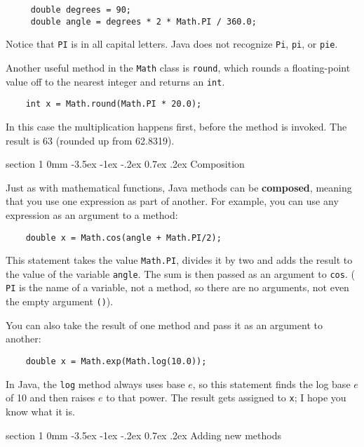 \documentclass{book}
\makeatletter
\renewcommand{\section}{\@startsection 
    {section} {1} {0mm}%
    {-3.5ex \@plus -1ex \@minus -.2ex}%
    {0.7ex \@plus.2ex}%
    {\normalfont\Large\bfseries}}
\makeatother
\begin{document}
\begin{verbatim}
     double degrees = 90;
     double angle = degrees * 2 * Math.PI / 360.0;
\end{verbatim}
%
Notice that {\tt PI} is in all capital letters.  Java does
not recognize {\tt Pi}, {\tt pi}, or {\tt pie}.

Another useful method in the {\tt Math} class is {\tt round},
which rounds a floating-point value off to the nearest integer
and returns an {\tt int}.

\begin{verbatim}
    int x = Math.round(Math.PI * 20.0);
\end{verbatim}
%
In this case the multiplication happens first, before the
method is invoked.  The result is 63 (rounded up from 62.8319).


\section {Composition}
\label{composition}

Just as with mathematical functions, Java methods can be {\bf
composed}, meaning that you use one expression as part of another.
For example, you can use any expression as an argument to a method:

\begin{verbatim}
    double x = Math.cos(angle + Math.PI/2);
\end{verbatim}
%
This statement takes the value {\tt Math.PI}, divides it by two and
adds the result to the value of the variable {\tt angle}.  The sum is
then passed as an argument to {\tt cos}. ({\tt
PI} is the name of a variable, not a method, so there are no
arguments, not even the empty argument {\tt()}).

You can also take the result of one method and pass it as
an argument to another:

\begin{verbatim}
    double x = Math.exp(Math.log(10.0));
\end{verbatim}
%
In Java, the {\tt log} method always uses base $e$, so this
statement finds the log base $e$ of 10 and then raises $e$ to that
power.  The result gets assigned to {\tt x}; I hope you know what it
is.

\section{Adding new methods}
\label{adding_methods}
\end{document}
